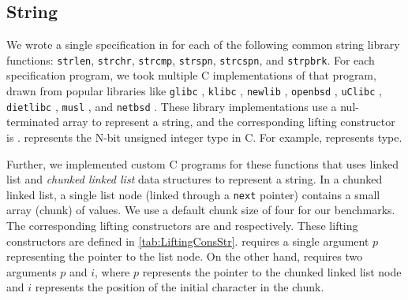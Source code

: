 \subsection{String}
\label{sec:expstring}
\vspace{-5px}
We wrote a single specification in \SpecL{} for each of the following
common string library functions: {\tt strlen}, {\tt strchr}, {\tt strcmp}, {\tt strspn},
{\tt strcspn}, and {\tt strpbrk}.  For each specification
program, we took multiple C implementations of that program, drawn from popular
libraries like {\tt glibc} \cite{glibc}, {\tt klibc} \cite{klibc}, {\tt newlib} \cite{newlib},
{\tt openbsd} \cite{openbsdlibc}, {\tt uClibc} \cite{uclibc},
{\tt dietlibc} \cite{dietlibc}, {\tt musl} \cite{musl}, and {\tt netbsd} \cite{netbsd}.
These library implementations use a nul-terminated array to represent
a string, and the corresponding lifting constructor is .
 represents the N-bit unsigned integer type in C.
For example,  represents  type.

Further, we implemented custom C programs for these functions that uses linked list
and {\em chunked linked list} data structures to represent a string.
In a chunked linked list, a single list node (linked through a {\tt next} pointer)
contains a small array (chunk) of values.
We use a default chunk size of four for our benchmarks.
The corresponding lifting constructors are 
and  respectively.
These lifting constructors are defined in \cref{tab:LiftingConsStr}.
 requires a single
argument $p$ representing the pointer to the list node.
On the other hand,  requires two arguments $p$
and $i$, where $p$ represents the pointer to the chunked linked list node
and $i$ represents the position of the initial character in the chunk.

